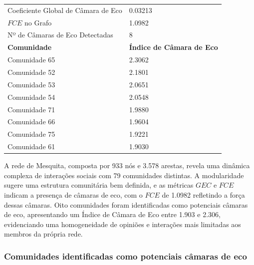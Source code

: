 \begin{table}[ht]
\begin{tabular}{l|l}
		\midrule
		Coeficiente Global de Câmara de Eco & 0.03213                          \\
		$FCE$ no Grafo                      & 1.0982                           \\
		Nº de Câmaras de Eco Detectadas     & 8                                \\
		\midrule
		\textbf{Comunidade}                 & \textbf{Índice de Câmara de Eco} \\
		\midrule
		Comunidade 65                       & 2.3062                           \\
		Comunidade 52                       & 2.1801                           \\
		Comunidade 53                       & 2.0651                           \\
		Comunidade 54                       & 2.0548                           \\
		Comunidade 71                       & 1.9880                           \\
		Comunidade 66                       & 1.9604                           \\
		Comunidade 75                       & 1.9221                           \\
		Comunidade 61                       & 1.9030                           \\
		\bottomrule
	\end{tabular}
\end{table}

A rede de Mesquita, composta por 933 nós e 3.578 arestas, revela uma dinâmica complexa de interações sociais com 79 comunidades distintas. A modularidade sugere uma estrutura comunitária bem definida, e as métricas $GEC$ e $FCE$ indicam a presença de câmaras de eco, com o $FCE$ de 1.0982 refletindo a força dessas câmaras. Oito comunidades foram identificadas como potenciais câmaras de eco, apresentando um Índice de Câmara de Eco entre 1.903 e 2.306, evidenciando uma homogeneidade de opiniões e interações mais limitadas aos membros da própria rede.

\subsubsection*{Comunidades identificadas como potenciais câmaras de eco}

